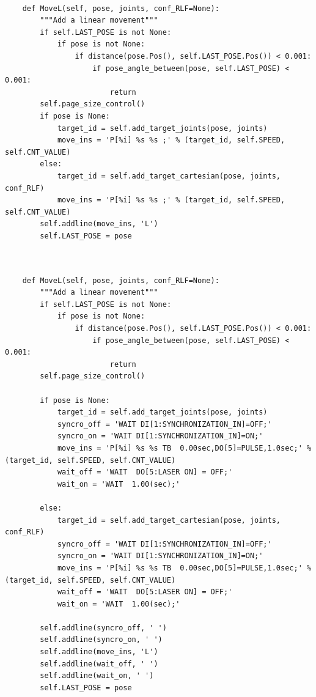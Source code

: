 \begin{lstlisting}[numbers=none,caption={Code snippet of original MoveL method},captionpos=b,label={code:originalMoveL}, language={}]

    def MoveL(self, pose, joints, conf_RLF=None):
        """Add a linear movement"""
        if self.LAST_POSE is not None:
            if pose is not None:
                if distance(pose.Pos(), self.LAST_POSE.Pos()) < 0.001:
                    if pose_angle_between(pose, self.LAST_POSE) < 0.001:
                        return
        self.page_size_control()
        if pose is None:
            target_id = self.add_target_joints(pose, joints)
            move_ins = 'P[%i] %s %s ;' % (target_id, self.SPEED, self.CNT_VALUE)
        else:
            target_id = self.add_target_cartesian(pose, joints, conf_RLF)
            move_ins = 'P[%i] %s %s ;' % (target_id, self.SPEED, self.CNT_VALUE)
        self.addline(move_ins, 'L')
        self.LAST_POSE = pose


\end{lstlisting}


\begin{lstlisting}[numbers=none,caption={Code snippet of modified MoveL method},captionpos=b,label={code:modifiedMoveL}, language={}]

    def MoveL(self, pose, joints, conf_RLF=None):
        """Add a linear movement"""
        if self.LAST_POSE is not None:
            if pose is not None:
                if distance(pose.Pos(), self.LAST_POSE.Pos()) < 0.001:
                    if pose_angle_between(pose, self.LAST_POSE) < 0.001:
                        return
        self.page_size_control()
        
        if pose is None:
            target_id = self.add_target_joints(pose, joints)
            syncro_off = 'WAIT DI[1:SYNCHRONIZATION_IN]=OFF;'
            syncro_on = 'WAIT DI[1:SYNCHRONIZATION_IN]=ON;'
            move_ins = 'P[%i] %s %s TB  0.00sec,DO[5]=PULSE,1.0sec;' % (target_id, self.SPEED, self.CNT_VALUE)
            wait_off = 'WAIT  DO[5:LASER ON] = OFF;'
            wait_on = 'WAIT  1.00(sec);'
            
        else:
            target_id = self.add_target_cartesian(pose, joints, conf_RLF)
            syncro_off = 'WAIT DI[1:SYNCHRONIZATION_IN]=OFF;'
            syncro_on = 'WAIT DI[1:SYNCHRONIZATION_IN]=ON;'
            move_ins = 'P[%i] %s %s TB  0.00sec,DO[5]=PULSE,1.0sec;' % (target_id, self.SPEED, self.CNT_VALUE)
            wait_off = 'WAIT  DO[5:LASER ON] = OFF;'
            wait_on = 'WAIT  1.00(sec);'
            
        self.addline(syncro_off, ' ')
        self.addline(syncro_on, ' ')
        self.addline(move_ins, 'L')
        self.addline(wait_off, ' ')
        self.addline(wait_on, ' ')
        self.LAST_POSE = pose


\end{lstlisting}


